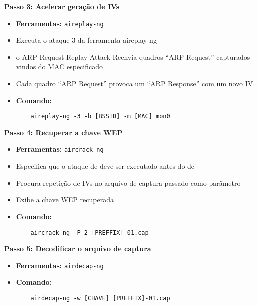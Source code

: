 \textbf{Passo 3: Acelerar geração de IVs}
\begin{itemize}
    \item \textbf{Ferramentas:} \texttt{aireplay-ng}
    \item Executa o ataque 3 da ferramenta aireplay-ng
        \item o ARP Request Replay Attack
Reenvia quadros “ARP Request” capturados vindos do MAC especificado
   \item Cada quadro “ARP Request” provoca um “ARP Response” com um novo IV

    \item \textbf{Comando:}
    \begin{verbatim}
    aireplay-ng -3 -b [BSSID] -m [MAC] mon0
    \end{verbatim}
\end{itemize}

\textbf{Passo 4: Recuperar a chave WEP}
\begin{itemize}
    \item \textbf{Ferramentas:} \texttt{aircrack-ng}
    \item Especifica que o ataque de \cite{Tews2007} deve ser executado antes do de \cite{Fluhrer2001}
    \item Procura repetição de IVs no arquivo de captura passado como parâmetro
    \item Exibe a chave WEP recuperada

    \item \textbf{Comando:}
    \begin{verbatim}
    aircrack-ng -P 2 [PREFFIX]-01.cap
    \end{verbatim}
\end{itemize}

\textbf{Passo 5: Decodificar o arquivo de captura}
\begin{itemize}
    \item \textbf{Ferramentas:} \texttt{airdecap-ng}
    \item \textbf{Comando:}
    \begin{verbatim}
    airdecap-ng -w [CHAVE] [PREFFIX]-01.cap
    \end{verbatim}
\end{itemize}


    

